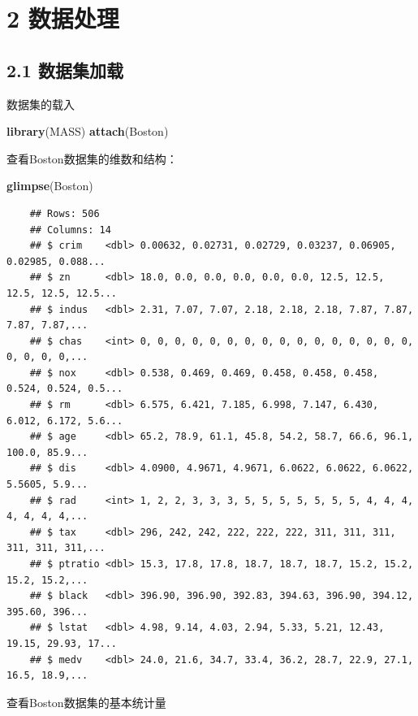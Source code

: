\documentclass[UTF-8]{ctexart}
\newenvironment{Shaded}{\begin{snugshade}}{\end{snugshade}}
\newcommand{\KeywordTok}[1]{\textcolor[rgb]{0.13,0.29,0.53}{\textbf{#1}}}
\newcommand{\NormalTok}[1]{#1}
\begin{document}
	\section{2 数据处理}
	
	\subsection{2.1 数据集加载}
	数据集的载入
	
\begin{Shaded}
\begin{Highlighting}[]
\KeywordTok{library}\NormalTok{(MASS)}
\KeywordTok{attach}\NormalTok{(Boston)}
\end{Highlighting}
\end{Shaded}
	
	查看Boston数据集的维数和结构：
	
	\begin{Shaded}
	\begin{Highlighting}[]
\KeywordTok{glimpse}\NormalTok{(Boston)}
	\end{Highlighting}
	\end{Shaded}
	
	\begin{verbatim}
	## Rows: 506
	## Columns: 14
	## $ crim    <dbl> 0.00632, 0.02731, 0.02729, 0.03237, 0.06905, 0.02985, 0.088...
	## $ zn      <dbl> 18.0, 0.0, 0.0, 0.0, 0.0, 0.0, 12.5, 12.5, 12.5, 12.5, 12.5...
	## $ indus   <dbl> 2.31, 7.07, 7.07, 2.18, 2.18, 2.18, 7.87, 7.87, 7.87, 7.87,...
	## $ chas    <int> 0, 0, 0, 0, 0, 0, 0, 0, 0, 0, 0, 0, 0, 0, 0, 0, 0, 0, 0, 0,...
	## $ nox     <dbl> 0.538, 0.469, 0.469, 0.458, 0.458, 0.458, 0.524, 0.524, 0.5...
	## $ rm      <dbl> 6.575, 6.421, 7.185, 6.998, 7.147, 6.430, 6.012, 6.172, 5.6...
	## $ age     <dbl> 65.2, 78.9, 61.1, 45.8, 54.2, 58.7, 66.6, 96.1, 100.0, 85.9...
	## $ dis     <dbl> 4.0900, 4.9671, 4.9671, 6.0622, 6.0622, 6.0622, 5.5605, 5.9...
	## $ rad     <int> 1, 2, 2, 3, 3, 3, 5, 5, 5, 5, 5, 5, 5, 4, 4, 4, 4, 4, 4, 4,...
	## $ tax     <dbl> 296, 242, 242, 222, 222, 222, 311, 311, 311, 311, 311, 311,...
	## $ ptratio <dbl> 15.3, 17.8, 17.8, 18.7, 18.7, 18.7, 15.2, 15.2, 15.2, 15.2,...
	## $ black   <dbl> 396.90, 396.90, 392.83, 394.63, 396.90, 394.12, 395.60, 396...
	## $ lstat   <dbl> 4.98, 9.14, 4.03, 2.94, 5.33, 5.21, 12.43, 19.15, 29.93, 17...
	## $ medv    <dbl> 24.0, 21.6, 34.7, 33.4, 36.2, 28.7, 22.9, 27.1, 16.5, 18.9,...
	\end{verbatim}
	
	查看Boston数据集的基本统计量
	
\end{document}
